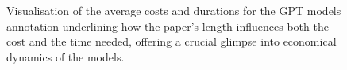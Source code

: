 \begin{figure}[htbp]
  \centering
  \quad 
  \caption[Cost Analysis]{Visualisation of the average costs and durations for the GPT models annotation underlining how the paper's length influences both the cost and the time needed, offering a crucial glimpse into economical dynamics of the models.}\label{fig:gpt-cost-anal}
\end{figure}

